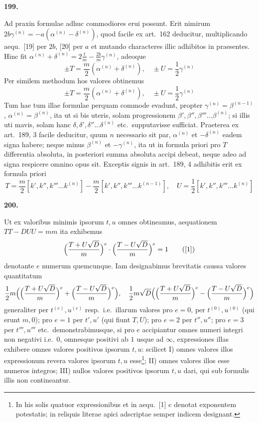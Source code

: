 \documentclass[12pt,a4paper]{article}
\theoremstyle{plain}
\theoremstyle{definition}
\theoremstyle{remark}
\begin{document}
\textbf{199.}

Ad praxin formulae adhuc commodiores erui possunt. Erit nimirum $2b\gamma^{(n)}=-a(\alpha^{(n)}-\delta^{(n)})$, quod facile ex art.\ 162 deducitur, multiplicando aequ.\ [19] per $2b$, [20] per $a$ et mutando characteres illic adhibitos in praesentes. Hinc fit $\alpha^{(n)}+\delta^{(n)}=2\frac{t}{m}-\frac{2b}{m}\gamma^{(n)}$, adeoque
\[\pm T=\frac{m}{2}(\alpha^{(n)}+\delta^{(n)}),\quad \pm U=\frac{1}{2}\gamma^{(n)}\]
Per similem methodum hos valores obtinemus
\[\pm T=\frac{m}{2}(\alpha^{(n)}+\delta^{(n)}),\quad \pm U=\frac{1}{2}\gamma^{(n)}\]
Tum hae tum illae formulae perquam commode evadunt, propter $\gamma^{(n)}=\beta^{(n-1)}$, $\alpha^{(n)}=\beta^{(n)}$, ita ut si bis uteris, solam progressionem $\beta',\beta'',\beta'''\ldots\beta^{(n)}$; si illis uti mavis, solam hanc $\delta,\delta',\delta''\ldots\delta^{(n)}$ etc.\ supputavisse sufficiat. Praeterea ex art.\ 189, 3 facile deducitur, quum $n$ necessario sit par, $\alpha^{(n)}$ et $-\delta^{(n)}$ eadem signa habere; neque minus $\beta^{(n)}$ et $-\gamma^{(n)}$, ita ut in formula priori pro $T$ differentia absoluta, in posteriori summa absoluta accipi debeat, neque adeo ad signa respicere omnino opus sit. Exceptis signis in art.\ 189, 4 adhibitis erit ex formula priori
\[T=\frac{m}{2}[k',k'',k'''\ldots k^{(n)}]-\frac{m}{2}[k',k'',k'''\ldots k^{(n-1)}],\quad U=\frac{1}{2}[k',k'',k'''\ldots k^{(n)}]\]

\textbf{200.}

Ut ex valoribus minimis ipsorum $t,u$ omnes obtineamus, aequationem $TT-DUU=mm$ ita exhibemus
\[\Bigl(\frac{T+U\sqrt{D}}{m}\Bigr)^e\cdot\Bigl(\frac{T-U\sqrt{D}}{m}\Bigr)^e=1\tag{[1]}\]
denotante $e$ numerum quemcunque. Iam designabimus brevitatis caussa valores quantitatum
\[\frac{1}{2}m\Bigl(\Bigl(\frac{T+U\sqrt{D}}{m}\Bigr)^e+\Bigl(\frac{T-U\sqrt{D}}{m}\Bigr)^e\Bigr),\quad
\frac{1}{2}m\sqrt{D}\Bigl(\Bigl(\frac{T+U\sqrt{D}}{m}\Bigr)^e-\Bigl(\frac{T-U\sqrt{D}}{m}\Bigr)^e\Bigr)\]
generaliter per $t^{(e)},u^{(e)}$ resp.\ i.e.\ illarum valores pro $e=0$, per $t^{(0)},u^{(0)}$ (qui erunt $m,0$); pro $e=1$ per $t',u'$ (qui fiunt $T,U$); pro $e=2$ per $t'',u''$; pro $e=3$ per $t''',u'''$ etc.\ demonstrabimusque, si pro $e$ accipiantur omnes numeri integri non negativi i.e.\ $0$, omnesque positivi ab $1$ usque ad $\infty$, expressiones illas exhibere omnes valores positivos ipsorum $t,u$: scilicet I) omnes valores illos expressionum revera valores ipsorum $t,u$ esse\footnote{In his solis quatuor expressionibus et in aequ.\ [1] $e$ denotat exponentem potestatis; in reliquis literae apici adscriptae semper indicem designant.}; II) omnes valores illos esse numeros integros; III) nullos valores positivos ipsorum $t,u$ dari, qui sub formulis illis non contineantur.
\end{document}
